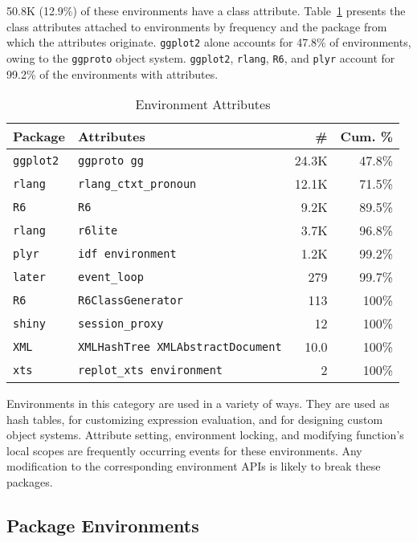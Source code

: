 \documentclass[10pt,review,sigplan,authorversion=true]{acmart}
\newcommand{\code}[1]{\lstinline |#1|\xspace}
\begin{document}
50.8K (12.9\%) of these environments have a class attribute.
Table~\ref{table:explicit_env_attr} presents the class attributes attached to
environments by frequency and the package from which the attributes originate.
\code{ggplot2} alone accounts for 47.8\% of environments, owing to the
\code{ggproto} object system. \code{ggplot2}, \code{rlang}, \code{R6}, and
\code{plyr} account for 99.2\% of the environments with attributes.
\begin{table}[!h]
  \small
  \caption{Environment Attributes} \label{table:explicit_env_attr}
  \centering
  \begin{tabular}{@{}ll@{}rr@{}}
    \toprule
    \textbf{Package}&\textbf{Attributes}&\textbf{\#}&\textbf{Cum. \%}\\
    \midrule
    \texttt{ggplot2}&\texttt{ggproto gg}&24.3K&47.8\%\\
    \texttt{rlang}&\texttt{rlang\_ctxt\_pronoun}&12.1K&71.5\%\\
    \texttt{R6}&\texttt{R6}&9.2K&89.5\%\\
    \texttt{rlang}&\texttt{r6lite}&3.7K&96.8\%\\
    \texttt{plyr}&\texttt{idf environment}&1.2K&99.2\%\\
    \texttt{later}&\texttt{event\_loop}&279&99.7\%\\
    \texttt{R6}&\texttt{R6ClassGenerator}&113&100\%\\
    \texttt{shiny}&\texttt{session\_proxy}&12&100\%\\
    \texttt{XML}&\texttt{XMLHashTree XMLAbstractDocument}&10.0&100\%\\
    \texttt{xts}&\texttt{replot\_xts environment}&2&100\%\\
    \bottomrule
  \end{tabular}
\end{table}

Environments in this category are used in a variety of ways. They are used as
hash tables, for customizing expression evaluation, and for designing custom
object systems. Attribute setting, environment locking, and modifying function's
local scopes are frequently occurring events for these environments. Any
modification to the corresponding environment APIs is likely to break these
packages.


\subsection{Package Environments}
\end{document}
